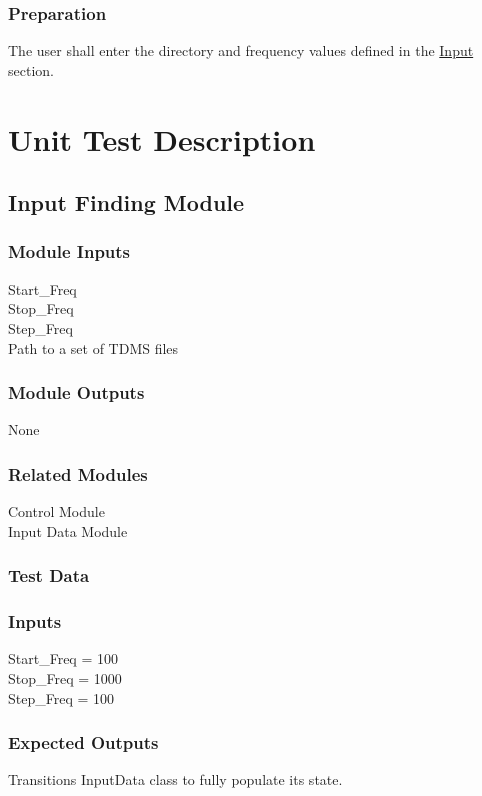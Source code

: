 \documentclass[12pt]{article}
\begin{document}
\subsubsection{Preparation}
The user shall enter the directory and frequency values defined in the
 \hyperref[Input_Grade0]{Input} section.

%
%
\section{Unit Test Description}


\subsection{Input Finding Module}

\subsubsection{Module Inputs}
Start\_Freq\\
Stop\_Freq\\
Step\_Freq\\
Path to a set of TDMS files
\subsubsection{Module Outputs}
None

\subsubsection{Related Modules}
Control Module\\
Input Data Module
\subsubsection{Test Data}

\subsubsection{Inputs}
Start\_Freq = 100\\
Stop\_Freq = 1000\\
Step\_Freq = 100\\

\subsubsection{Expected Outputs}
Transitions InputData class to fully populate its state.
\end{document}
